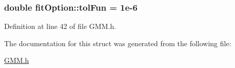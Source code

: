 \hypertarget{structfit_option_a4523efadc5bc4f29cd1648ac4ca018dd}{
\subsubsection[{tol\+Fun}]{\setlength{\rightskip}{0pt plus 5cm}double fit\+Option\+::tol\+Fun = 1e-\/6}}\label{structfit_option_a4523efadc5bc4f29cd1648ac4ca018dd}


Definition at line 42 of file G\+M\+M.\+h.



The documentation for this struct was generated from the following file\+:\begin{DoxyCompactItemize}
\item 
\hyperlink{_g_m_m_8h}{G\+M\+M.\+h}\end{DoxyCompactItemize}
